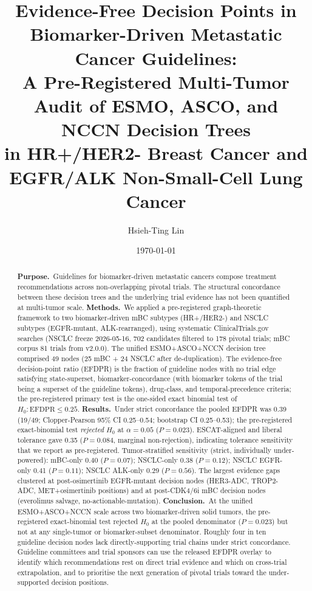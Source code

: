 \documentclass[11pt,a4paper]{article}
\title{\fontsize{15}{18}\bfseries\sffamily
Evidence-Free Decision Points in Biomarker-Driven Metastatic Cancer Guidelines: \\
A Pre-Registered Multi-Tumor Audit of ESMO, ASCO, and NCCN Decision Trees \\
in HR+/HER2- Breast Cancer and EGFR/ALK Non-Small-Cell Lung Cancer}
\author[1,*]{Hsieh-Ting Lin}
\affil[1]{Department of Hematology \& Medical Oncology, Koo Foundation Sun Yat-Sen Cancer Center, 125 Lide Rd., Beitou Dist., Taipei 11259, Taiwan. ORCID iD: 0009-0002-3974-4528.}
\affil[*]{Correspondence: \texttt{htlin222@kfsyscc.org}.}
\date{\today}
\begin{document}
\maketitle
\thispagestyle{empty}
\vspace{-1.5em}

\begin{abstract}
\noindent
\textbf{Purpose.}\, Guidelines for biomarker-driven metastatic cancers compose treatment recommendations across non-overlapping pivotal trials. The structural concordance between these decision trees and the underlying trial evidence has not been quantified at multi-tumor scale.
\textbf{Methods.}\, We applied a pre-registered graph-theoretic framework to two biomarker-driven mBC subtypes (HR+/HER2-) and NSCLC subtypes (EGFR-mutant, ALK-rearranged), using systematic ClinicalTrials.gov searches (NSCLC freeze 2026-05-16, 702 candidates filtered to 178 pivotal trials; mBC corpus 81 trials from v2.0.0). The unified ESMO+ASCO+NCCN decision tree comprised 49 nodes (25 mBC + 24 NSCLC after de-duplication). The evidence-free decision-point ratio (EFDPR) is the fraction of guideline nodes with no trial edge satisfying state-superset, biomarker-concordance (with biomarker tokens of the trial being a superset of the guideline tokens), drug-class, and temporal-precedence criteria; the pre-registered primary test is the one-sided exact binomial test of $H_0: \mathrm{EFDPR} \le 0.25$.
\textbf{Results.}\, Under strict concordance the pooled EFDPR was 0.39 (19/49; Clopper-Pearson 95\% CI 0.25--0.54; bootstrap CI 0.25--0.53); the pre-registered exact-binomial test \emph{rejected} $H_0$ at $\alpha = 0.05$ ($P = 0.023$). ESCAT-aligned and liberal tolerance gave 0.35 ($P = 0.084$, marginal non-rejection), indicating tolerance sensitivity that we report as pre-registered. Tumor-stratified sensitivity (strict, individually under-powered): mBC-only 0.40 ($P = 0.07$); NSCLC-only 0.38 ($P = 0.12$); NSCLC EGFR-only 0.41 ($P = 0.11$); NSCLC ALK-only 0.29 ($P = 0.56$). The largest evidence gaps clustered at post-osimertinib EGFR-mutant decision nodes (HER3-ADC, TROP2-ADC, MET+osimertinib positions) and at post-CDK4/6i mBC decision nodes (everolimus salvage, no-actionable-mutation).
\textbf{Conclusion.}\, At the unified ESMO+ASCO+NCCN scale across two biomarker-driven solid tumors, the pre-registered exact-binomial test rejected $H_0$ at the pooled denominator ($P = 0.023$) but not at any single-tumor or biomarker-subset denominator. Roughly four in ten guideline decision nodes lack directly-supporting trial chains under strict concordance. Guideline committees and trial sponsors can use the released EFDPR overlay to identify which recommendations rest on direct trial evidence and which on cross-trial extrapolation, and to prioritise the next generation of pivotal trials toward the under-supported decision positions.
\end{abstract}
\end{document}
